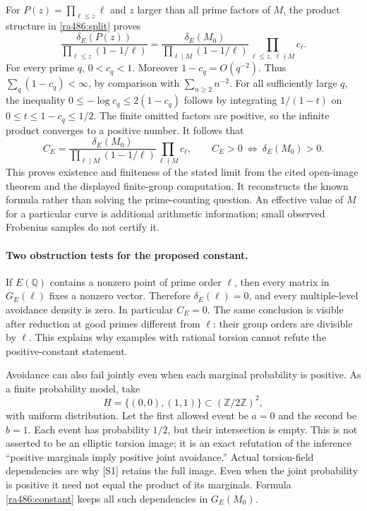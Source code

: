 \documentclass[11pt]{article}
\begin{document}
For $P(z)=\prod_{\ell\le z}\ell$ and $z$ larger than all prime factors
of $M$, the product structure in \eqref{ra486:split} proves
\[
 \frac{\delta_E(P(z))}{\prod_{\ell\le z}(1-1/\ell)}
 =\frac{\delta_E(M_0)}{\prod_{\ell\mid M}(1-1/\ell)}
       \prod_{\ell\le z,\ \ell\nmid M}c_\ell.
\]
For every prime $q$, $0<c_q<1$. Moreover $1-c_q=O(q^{-2})$.
Thus $\sum_q(1-c_q)<\infty$, by comparison with $\sum_{n\ge2}n^{-2}$.
For all sufficiently large $q$, the inequality
$0\le-\log c_q\le2(1-c_q)$ follows by integrating $1/(1-t)$ on
$0\le t\le1-c_q\le1/2$. The finite omitted factors are positive, so
the infinite product converges to a positive number. It follows that
\begin{equation}\label{ra486:constant}
 C_E=\frac{\delta_E(M_0)}{\prod_{\ell\mid M}(1-1/\ell)}
                   \prod_{\ell\nmid M}c_\ell,
 \qquad C_E>0\ \Longleftrightarrow\ \delta_E(M_0)>0.
\end{equation}
This proves existence and finiteness of the stated limit from the cited
open-image theorem and the displayed finite-group computation. It
reconstructs the known formula rather than solving the prime-counting
question. An effective value of $M$ for a particular curve is additional
arithmetic information; small observed Frobenius samples do not certify it.

\paragraph{Two obstruction tests for the proposed constant.}
If $E(\mathbb Q)$ contains a nonzero point of prime order $\ell$, then
every matrix in $G_E(\ell)$ fixes a nonzero vector. Therefore
$\delta_E(\ell)=0$, and every multiple-level avoidance density is zero.
In particular $C_E=0$. The same conclusion is visible after reduction at
good primes different from $\ell$: their group orders are divisible by
$\ell$. This explains why examples with rational torsion cannot refute the
positive-constant statement.

Avoidance can also fail jointly even when each marginal probability is
positive. As a finite probability model, take
\[
 H=\{(0,0),(1,1)\}\subset(\mathbb Z/2\mathbb Z)^2,
\]
with uniform distribution. Let the first allowed event be $a=0$ and the
second be $b=1$. Each event has probability $1/2$, but their intersection
is empty. This is not asserted to be an elliptic torsion image; it is an
exact refutation of the inference ``positive marginals imply positive
joint avoidance.'' Actual torsion-field dependencies are why [S1] retains
the full image. Even when the joint probability is positive it need not
equal the product of its marginals. Formula \eqref{ra486:constant} keeps
all such dependencies in $G_E(M_0)$.
\end{document}
